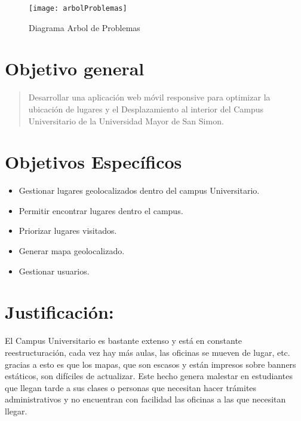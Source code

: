 

  \begin{figure}[!hbp]
    \begin{center}
      \texttt{[image: arbolProblemas]}
    \end{center}
    \caption{Diagrama Arbol de Problemas}
    \label{fig:arbolProblemas}
  \end{figure}

  \section{Objetivo general} %
  \label{sec:objetivo_general}
    \begin{quote}
      Desarrollar una aplicación web móvil responsive para optimizar la ubicación de lugares y el  Desplazamiento al interior del Campus Universitario de la Universidad Mayor de San Simon.
    \end{quote}


  \section{Objetivos Específicos} %
  \label{sec:obj_especificos}
    \begin{itemize}
      \item Gestionar lugares geolocalizados dentro del campus Universitario.
      \item Permitir encontrar lugares dentro el campus.
      \item Priorizar lugares visitados.
      \item Generar mapa geolocalizado.
      \item Gestionar usuarios.
    \end{itemize}


  \section{Justificación:} %
  \label{sec:justificacion}
  El Campus Universitario es bastante extenso y está en constante reestructuración, cada vez hay más aulas, las oficinas se mueven de lugar, etc. gracias a esto es que los mapas, que son escasos y están impresos sobre banners estáticos, son difíciles de actualizar. Este hecho genera malestar en estudiantes que llegan tarde a sus clases o personas que necesitan hacer trámites administrativos y no encuentran con facilidad las oficinas a las que necesitan llegar.\\


